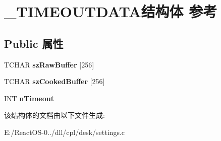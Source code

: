 \hypertarget{struct___t_i_m_e_o_u_t_d_a_t_a}{}\section{\+\_\+\+T\+I\+M\+E\+O\+U\+T\+D\+A\+T\+A结构体 参考}
\label{struct___t_i_m_e_o_u_t_d_a_t_a}
\subsection*{Public 属性}
\begin{DoxyCompactItemize}
\item 
\mbox{\label{struct___t_i_m_e_o_u_t_d_a_t_a_a833cb39bc0f41e71509f32a3affce0bd}} 
T\+C\+H\+AR {\bfseries sz\+Raw\+Buffer} \mbox{[}256\mbox{]}
\item 
\mbox{\label{struct___t_i_m_e_o_u_t_d_a_t_a_a6bc8b0416823c9ca731fc8b6cfcf1b19}} 
T\+C\+H\+AR {\bfseries sz\+Cooked\+Buffer} \mbox{[}256\mbox{]}
\item 
\mbox{\label{struct___t_i_m_e_o_u_t_d_a_t_a_a2c7dcc8df147ba2f49cb009a8c8ea28c}} 
I\+NT {\bfseries n\+Timeout}
\end{DoxyCompactItemize}


该结构体的文档由以下文件生成\+:\begin{DoxyCompactItemize}
\item 
E\+:/\+React\+O\+S-\/0../dll/cpl/desk/settings.\+c\end{DoxyCompactItemize}
